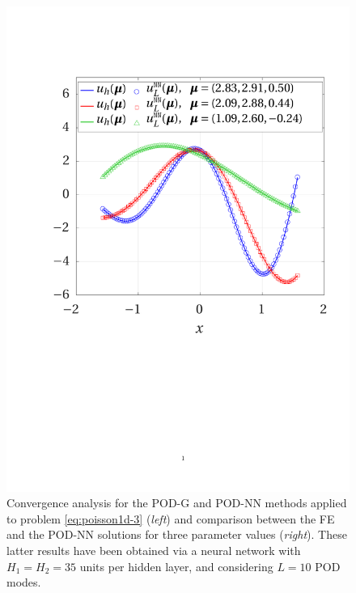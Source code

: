 \documentclass[12pt, a4paper, twoside, openright, notitlepage]{report}
\numberwithin{equation}{chapter}
\theoremstyle{theorem}
\theoremstyle{definition}
\theoremstyle{remark}
\theoremstyle{proposition}
\numberwithin{figure}{chapter}
\begin{document}
\begin{figure}[H]
			\includegraphics[scale = 0.4, trim = {1.5cm 9cm 1.5cm 3cm}, clip]{poisson1d_3_fe_vs_podnn}
			
			\caption{Convergence analysis for the POD-G and POD-NN methods applied to problem \eqref{eq:poisson1d-3} (\emph{left}) and comparison between the FE and the POD-NN solutions for three parameter values (\emph{right}). These latter results have been obtained via a neural network with $H_1 = H_2 = 35$ units per hidden layer, and considering $L = 10$ POD modes.}
			\label{fig:poisson1d-3-fig2}
		\end{figure}
		
\end{document}
